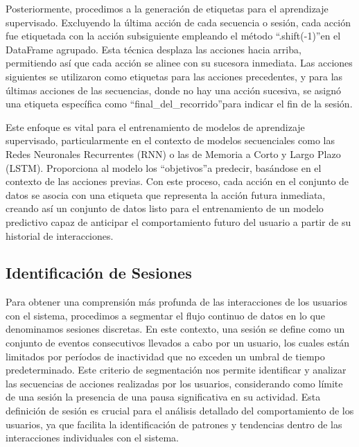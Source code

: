 Posteriormente, procedimos a la generación de etiquetas para el aprendizaje supervisado. Excluyendo la última acción de cada secuencia o sesión, cada acción fue etiquetada con la acción subsiguiente empleando el método \textquotedblleft .shift(-1)\textquotedblright en el DataFrame agrupado. Esta técnica desplaza las acciones hacia arriba, permitiendo así que cada acción se alinee con su sucesora inmediata. Las acciones siguientes se utilizaron como etiquetas para las acciones precedentes, y para las últimas acciones de las secuencias, donde no hay una acción sucesiva, se asignó una etiqueta específica como \textquotedblleft final\_del\_recorrido\textquotedblright para indicar el fin de la sesión.

Este enfoque es vital para el entrenamiento de modelos de aprendizaje supervisado, particularmente en el contexto de modelos secuenciales como las Redes Neuronales Recurrentes (RNN) o las de Memoria a Corto y Largo Plazo (LSTM). Proporciona al modelo los \textquotedblleft objetivos\textquotedblright a predecir, basándose en el contexto de las acciones previas. Con este proceso, cada acción en el conjunto de datos se asocia con una etiqueta que representa la acción futura inmediata, creando así un conjunto de datos listo para el entrenamiento de un modelo predictivo capaz de anticipar el comportamiento futuro del usuario a partir de su historial de interacciones.

\subsection{Identificación de Sesiones}

Para obtener una comprensión más profunda de las interacciones de los usuarios con el sistema, procedimos a segmentar el flujo continuo de datos en lo que denominamos sesiones discretas. En este contexto, una sesión se define como un conjunto de eventos consecutivos llevados a cabo por un usuario, los cuales están limitados por períodos de inactividad que no exceden un umbral de tiempo predeterminado. Este criterio de segmentación nos permite identificar y analizar las secuencias de acciones realizadas por los usuarios, considerando como límite de una sesión la presencia de una pausa significativa en su actividad. Esta definición de sesión es crucial para el análisis detallado del comportamiento de los usuarios, ya que facilita la identificación de patrones y tendencias dentro de las interacciones individuales con el sistema.

